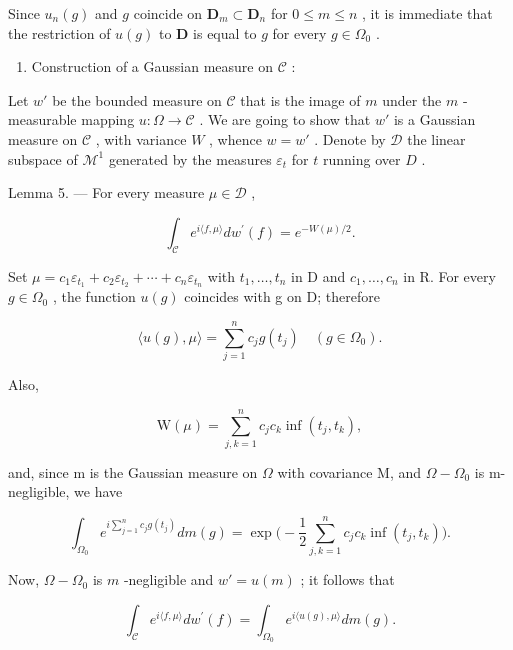 Since \(u_{n}(g)\) and \(g\) coincide on \(\mathbf{D}_m \subset \mathbf{D}_n\) for \(0 \leqslant m \leqslant n\) , it is immediate that the restriction of \(u(g)\) to \(\mathbf{D}\) is equal to \(g\) for every \(g \in \Omega_0\) .

\begin{enumerate}
\def\labelenumi{\Alph{enumi})}
\setcounter{enumi}{2}
\tightlist
\item
  Construction of a Gaussian measure on \(\mathcal{C}\) :
\end{enumerate}

Let \(w'\) be the bounded measure on \(\mathcal{C}\) that is the image of \(m\) under the \(m\) -measurable mapping \(u: \Omega \to \mathcal{C}\) . We are going to show that \(w'\) is a Gaussian measure on \(\mathcal{C}\) , with variance \(W\) , whence \(w = w'\) . Denote by \(\mathcal{D}\) the linear subspace of \(\mathcal{M}^1\) generated by the measures \(\varepsilon_t\) for \(t\) running over \(D\) .

Lemma 5. --- For every measure \(\mu \in \mathcal{D}\) ,

\[
\int_ {\mathcal {C}} e ^ {i \langle f, \mu \rangle} d w ^ {\prime} (f) = e ^ {- W (\mu) / 2}.\tag{48}
\]

Set \(\mu=c_{1}\varepsilon_{t_{1}}+c_{2}\varepsilon_{t_{2}}+\cdots+c_{n}\varepsilon_{t_{n}}\) with \(t_{1},\ldots,t_{n}\) in D and \(c_{1},\ldots,c_{n}\) in R. For every \(g\in\Omega_{0}\) , the function \(u(g)\) coincides with g on D; therefore

\[
\langle u (g), \mu \rangle = \sum_ {j = 1} ^ {n} c _ {j} g (t _ {j}) \quad (g \in \Omega_ {0}).\tag{49}
\]

Also,

\[
\mathrm{W} (\mu) = \sum_ {j, k = 1} ^ {n} c _ {j} c _ {k} \inf (t _ {j}, t _ {k}),\tag{50}
\]

and, since m is the Gaussian measure on \(\Omega\) with covariance M, and \(\Omega - \Omega_{0}\) is m-negligible, we have

\[
\int_ {\Omega_ {0}} e ^ {i \sum_ {j = 1} ^ {n} c _ {j} g (t _ {j})} d m (g) = \exp \Big (- \frac {1}{2} \sum_ {j, k = 1} ^ {n} c _ {j} c _ {k} \inf (t _ {j}, t _ {k}) \Big).\tag{51}
\]

Now, \(\Omega - \Omega_0\) is \(m\) -negligible and \(w' = u(m)\) ; it follows that

\[
\int_ {\mathcal {C}} e ^ {i \langle f, \mu \rangle} d w ^ {\prime} (f) = \int_ {\Omega_ {0}} e ^ {i \langle u (g), \mu \rangle} d m (g).\tag{52}
\]

